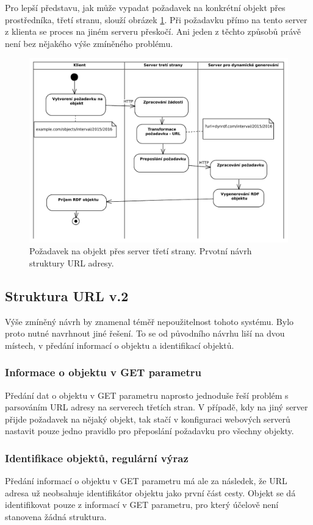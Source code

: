\documentclass[thesis=B,czech]{FITthesis}[2012/06/26]
\begin{document}
 Pro lepší představu, jak může vypadat požadavek na konkrétní objekt přes prostředníka, třetí stranu, slouží obrázek \ref{request_flow_2}. Při požadavku
 přímo na tento server z klienta se proces na jiném serveru přeskočí. Ani jeden z těchto způsobů právě není bez nějakého výše zmíněného problému. 
 \begin{figure}\centering
 	\includegraphics[width=1\textwidth]{request_flow}
 	\caption[Požadavek na objekt přes server třetí strany]{Požadavek na objekt přes server třetí strany. Prvotní návrh struktury URL adresy.}\label{request_flow_2}
 \end{figure}
 
 \subsection{Struktura URL v.2}
  Výše zmíněný návrh by znamenal téměř nepoužitelnost tohoto systému. Bylo proto nutné navrhnout jiné řešení. To se od původního návrhu liší na dvou místech, v předání
  informací o objektu a identifikací objektů.
  
  \subsubsection{Informace o objektu v GET parametru}
   Předání dat o objektu v GET parametru naprosto jednoduše řeší problém s parsováním URL adresy na serverech třetích stran. V případě, kdy na jiný server přijde požadavek
   na nějaký objekt, tak stačí v konfiguraci webových serverů nastavit pouze jedno pravidlo pro přeposlání požadavku pro všechny objekty.
  
  \subsubsection{Identifikace objektů, regulární výraz}
   Předání informací o objektu v GET parametru má ale za následek, že URL adresa už neobsahuje identifikátor objektu jako první část cesty. Objekt se dá identifikovat 
   pouze z informací v GET parametru, pro který účelově není stanovena žádná struktura.
   
\end{document}
